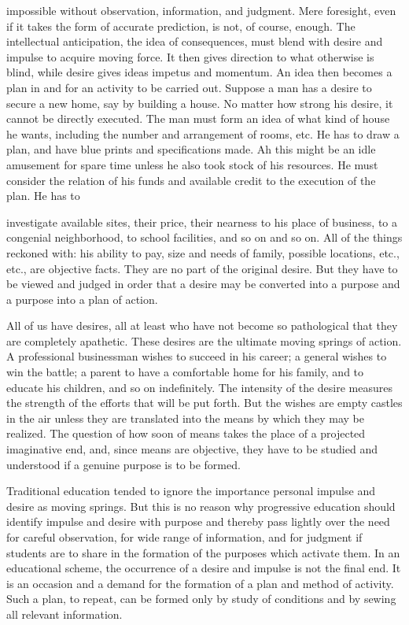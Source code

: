 impossible without observation, information, and judgment. Mere foresight, even if it 
takes the form of accurate prediction, is not, of course, enough. The intellectual 
anticipation, the idea of consequences, must blend with desire and impulse to acquire 
moving force. It then gives direction to what otherwise is blind, while desire gives ideas 
impetus and momentum. An idea then becomes a plan in and for an activity to be carried 
out. Suppose a man has a desire to secure a new home, say by building a house. No 
matter how strong his desire, it cannot be directly executed. The man must form an idea 
of what kind of house he wants, including the number and arrangement of rooms, etc. He 
has to draw a plan, and have blue prints and specifications made. Ah this might be an idle 
amusement for spare time unless he also took stock of his resources. He must consider 
the relation of his funds and available credit to the execution of the plan. He has to 



investigate available sites, their price, their nearness to his place of business, to a 
congenial neighborhood, to school facilities, and so on and so on. All of the things 
reckoned with: his ability to pay, size and needs of family, possible locations, etc., etc., 
are objective facts. They are no part of the original desire. But they have to be viewed 
and judged in order that a desire may be converted into a purpose and a purpose into a 
plan of action. 

All of us have desires, all at least who have not become so pathological that they are 
completely apathetic. These desires are the ultimate moving springs of action. A 
professional businessman wishes to succeed in his career; a general wishes to win the 
battle; a parent to have a comfortable home for his family, and to educate his children, 
and so on indefinitely. The intensity of the desire measures the strength of the efforts that 
will be put forth. But the wishes are empty castles in the air unless they are translated into 
the means by which they may be realized. The question of how soon of means takes the 
place of a projected imaginative end, and, since means are objective, they have to be 
studied and understood if a genuine purpose is to be formed. 

Traditional education tended to ignore the importance personal impulse and desire as 
moving springs. But this is no reason why progressive education should identify impulse 
and desire with purpose and thereby pass lightly over the need for careful observation, for 
wide range of information, and for judgment if students are to share in the formation of 
the purposes which activate them. In an educational scheme, the occurrence of a desire 
and impulse is not the final end. It is an occasion and a demand for the formation of a 
plan and method of activity. Such a plan, to repeat, can be formed only by study of 
conditions and by sewing all relevant information. 

